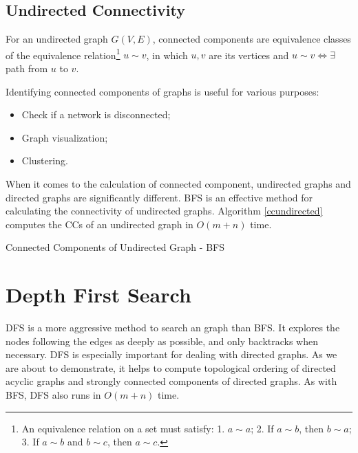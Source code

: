 \subsection{Undirected Connectivity}
\begin{definition}
For an undirected graph $G(V,E)$, connected components are equivalence classes of the equivalence relation\footnote{An equivalence relation on a set must satisfy: 1. $a\sim a$; 2. If $a\sim b$, then $b\sim a$; 3. If $a\sim b$ and $b\sim c$, then $a\sim c$.} $u\sim v$, in which $u,v$ are its vertices and $u\sim v\iff\exists$ path from $u$ to $v$. 
\end{definition} 

Identifying connected components of graphs is useful for various purposes:
\begin{itemize}
\item Check if a network is disconnected;
\item Graph visualization;
\item Clustering.
\end{itemize}
When it comes to the calculation of connected component, undirected graphs and directed graphs are significantly different. BFS is an effective method for calculating the connectivity of undirected graphs. Algorithm \ref{ccundirected} computes the CCs of an undirected graph in $O(m+n)$ time.
\begin{algorithm}[ht]
\caption{Connected Components of Undirected Graph - BFS}\label{ccundirected}
\begin{algorithmic}[1]
\Input{}
\Output{}
\EndIf
\EndFor
\end{algorithmic}
\end{algorithm}
\section{Depth First Search}
DFS is a more aggressive method to search an graph than BFS. It explores the nodes following the edges as deeply as possible, and only backtracks when necessary. DFS is especially important for dealing with directed graphs. As we are about to demonstrate, it helps to compute topological ordering of directed acyclic graphs and strongly connected components of directed graphs. As with BFS, DFS also runs in $O(m+n)$ time. 


